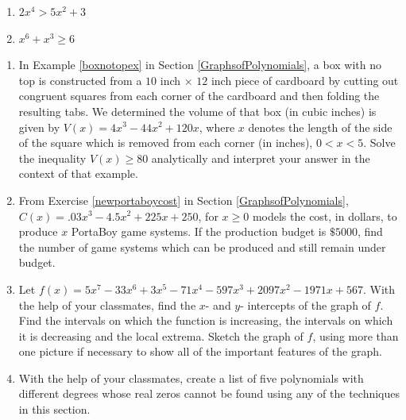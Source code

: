 \begin{multicols}{2}
\begin{enumerate}
\setcounter{enumi}{\value{HW}}

\item $2x^4>5x^2+3$
\item $x^6 + x^3 \geq 6$ \label{polyinequexerlast}

\setcounter{HW}{\value{enumi}}
\end{enumerate}
\end{multicols}

\begin{enumerate}
\setcounter{enumi}{\value{HW}}

\item  In Example \ref{boxnotopex} in Section \ref{GraphsofPolynomials}, a box with no top is constructed from a $10$ inch $\times$ $12$ inch piece of cardboard by cutting out congruent squares from each corner of the cardboard and then folding the resulting tabs.  We determined the volume of that box (in cubic inches) is given by  $V(x) = 4x^3-44x^2+120x$, where $x$ denotes the length of the side of the square which is removed from each corner (in inches), $0 < x < 5$.  Solve the inequality $V(x) \geq 80$ analytically and interpret your answer in the context of that example.

\item  From Exercise \ref{newportaboycost} in Section \ref{GraphsofPolynomials}, $C(x) = .03x^{3} - 4.5x^{2} + 225x + 250$, for $x \geq 0$ models the cost, in dollars, to produce $x$ PortaBoy game systems. If the production budget is $\$5000$, find the number of game systems which can be produced and still remain under budget.

\item Let $f(x) = 5x^{7} - 33x^{6} + 3x^{5} - 71x^{4} - 597x^{3} + 2097x^{2} - 1971x + 567$.  With the help of your classmates, find the $x$- and $y$- intercepts of the graph of $f$.  Find the intervals on which the function is increasing, the intervals on which it is decreasing and the local extrema.  Sketch the graph of $f$, using more than one picture if necessary to show all of the important features of the graph.  

\item With the help of your classmates, create a list of five polynomials with different degrees whose real zeros cannot be found using any of the techniques in this section.

\setcounter{HW}{\value{enumi}}
\end{enumerate}
 
